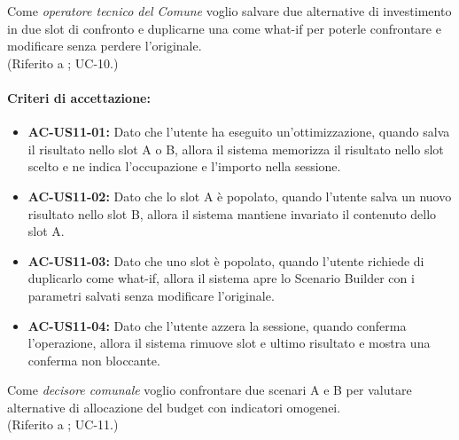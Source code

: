  \label{us:salva_ab}
Come \textit{operatore tecnico del Comune} voglio salvare due alternative di investimento in due slot di confronto e duplicarne una come what-if per poterle confrontare e modificare senza perdere l'originale. \\ (Riferito a ; UC-10.)

\paragraph{Criteri di accettazione:}
\begin{itemize}[leftmargin=1.4em]
    \item \textbf{AC-US11-01:} Dato che l'utente ha eseguito un'ottimizzazione, quando salva il risultato nello slot A o B, allora il sistema memorizza il risultato nello slot scelto e ne indica l'occupazione e l'importo nella sessione.
    \item \textbf{AC-US11-02:} Dato che lo slot A è popolato, quando l'utente salva un nuovo risultato nello slot B, allora il sistema mantiene invariato il contenuto dello slot A.
    \item \textbf{AC-US11-03:} Dato che uno slot è popolato, quando l'utente richiede di duplicarlo come what-if, allora il sistema apre lo Scenario Builder con i parametri salvati senza modificare l'originale.
    \item \textbf{AC-US11-04:} Dato che l'utente azzera la sessione, quando conferma l'operazione, allora il sistema rimuove slot e ultimo risultato e mostra una conferma non bloccante.
\end{itemize}

 \label{us:confronto}
Come \textit{decisore comunale} voglio confrontare due scenari A e B per valutare alternative di allocazione del budget con indicatori omogenei. \\ (Riferito a ; UC-11.)

